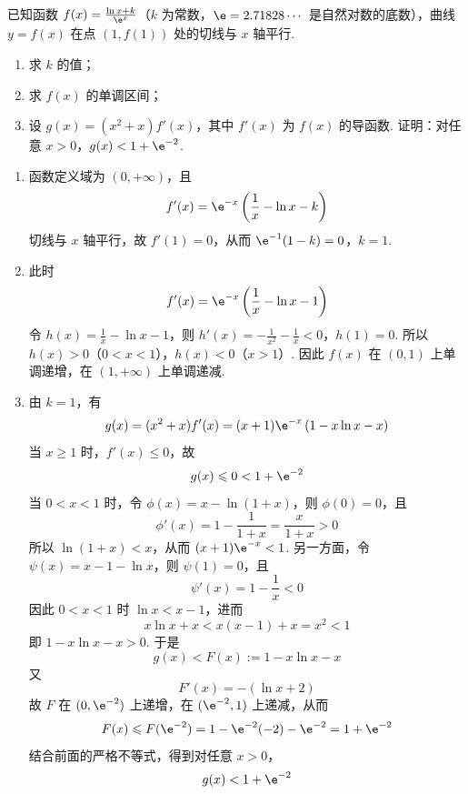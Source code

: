 \begin{problem}
已知函数 \( f(x) = \frac{\ln x + k}{\e^x} \)（\(k\) 为常数，\(\e = 2.71828 \cdots\) 是自然对数的底数），曲线 \( y = f(x) \) 在点 \( (1, f(1)) \) 处的切线与 \( x \) 轴平行.
\begin{enumerate}
\item 求 \(k\) 的值；
\item 求 \( f(x) \) 的单调区间；
\item 设 \( g(x) = (x^2 + x)f'(x) \)，其中 \( f'(x) \) 为 \( f(x) \) 的导函数. 证明：对任意 \(x > 0\)，\(g(x) < 1 + \e^{-2}\).
\end{enumerate}
\end{problem}

\begin{solution}
\begin{enumerate}
\item
函数定义域为 \((0,+\infty)\)，且
\[
f'(x)=\e^{-x}\left(\frac1x-\ln x-k\right)
\]
切线与 \(x\) 轴平行，故 \(f'(1)=0\)，从而
\(\e^{-1}(1-k)=0\)，\(k=1\).
\item
此时
\[
f'(x)=\e^{-x}\left(\frac1x-\ln x-1\right)
\]
令 \(h(x)=\frac1x-\ln x-1\)，则
\(h'(x)=-\frac1{x^2}-\frac1x<0\)，\(h(1)=0\).
所以 \(h(x)>0\)（\(0<x<1\)），\(h(x)<0\)（\(x>1\)）. 因此 \(f(x)\) 在 \((0,1)\) 上单调递增，在 \((1,+\infty)\) 上单调递减.
\item
由 \(k=1\)，有
\[
g(x)=(x^2+x)f'(x)
=(x+1)\e^{-x}\left(1-x\ln x-x\right)
\]
当 \(x\geqslant1\) 时，\(f'(x)\leqslant0\)，故
\[
g(x)\leqslant0<1+\e^{-2}
\]
当 \(0<x<1\) 时，令 \(\phi(x)=x-\ln(1+x)\)，则 \(\phi(0)=0\)，且
\[
\phi'(x)=1-\frac1{1+x}=\frac{x}{1+x}>0
\]
所以 \(\ln(1+x)<x\)，从而 \((x+1)\e^{-x}<1\). 另一方面，令 \(\psi(x)=x-1-\ln x\)，则 \(\psi(1)=0\)，且
\[
\psi'(x)=1-\frac1x<0
\]
因此 \(0<x<1\) 时 \(\ln x<x-1\)，进而
\[
x\ln x+x<x(x-1)+x=x^2<1
\]
即 \(1-x\ln x-x>0\). 于是
\[
g(x)<F(x):=1-x\ln x-x
\]
又
\[
F'(x)=-(\ln x+2)
\]
故 \(F\) 在 \((0,\e^{-2})\) 上递增，在 \((\e^{-2},1)\) 上递减，从而
\[
F(x)\leqslant F(\e^{-2})
=1-\e^{-2}(-2)-\e^{-2}
=1+\e^{-2}
\]
结合前面的严格不等式，得到对任意 \(x>0\)，
\[
g(x)<1+\e^{-2}
\]
\end{enumerate}
\end{solution}
